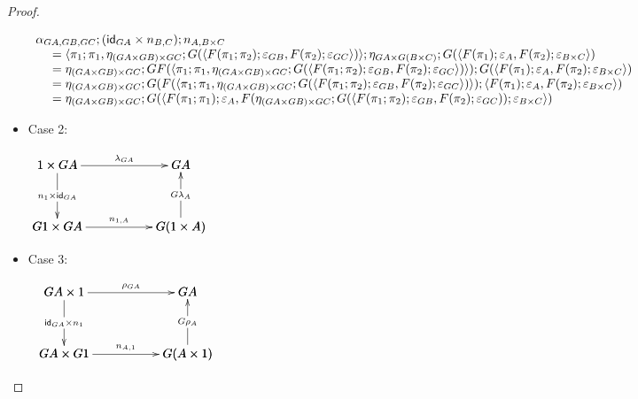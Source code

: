 \begin{proof}
\begin{itemize}
    \begin{center}
      \footnotesize
      \begin{math}
        \begin{array}{lll}
          \alpha_{GA,GB,GC};(\mathsf{id}_{GA} \times n_{B,C});n_{A,B \times C}\\
          \,\,\,\,\,\,\,\,=\langle \pi_1;\pi_1,  \eta_{(GA \times GB) \times GC};G(\langle F(\pi_1;\pi_2);\varepsilon_{GB}, F(\pi_2);\varepsilon_{GC} \rangle)\rangle;\eta_{GA \times G(B \times C)};G(\langle F(\pi_1);\varepsilon_A, F(\pi_2);\varepsilon_{B \times C} \rangle)\\
          \,\,\,\,\,\,\,\,=\eta_{(GA \times GB) \times GC};GF(\langle \pi_1;\pi_1,  \eta_{(GA \times GB) \times GC};G(\langle F(\pi_1;\pi_2);\varepsilon_{GB}, F(\pi_2);\varepsilon_{GC} \rangle)\rangle);G(\langle F(\pi_1);\varepsilon_A, F(\pi_2);\varepsilon_{B \times C} \rangle)\\
          \,\,\,\,\,\,\,\,=\eta_{(GA \times GB) \times GC};G(F(\langle \pi_1;\pi_1,  \eta_{(GA \times GB) \times GC};G(\langle F(\pi_1;\pi_2);\varepsilon_{GB}, F(\pi_2);\varepsilon_{GC} \rangle)\rangle);\langle F(\pi_1);\varepsilon_A, F(\pi_2);\varepsilon_{B \times C} \rangle)\\
          \,\,\,\,\,\,\,\,=\eta_{(GA \times GB) \times GC};G(\langle F(\pi_1;\pi_1);\varepsilon_A, F(\eta_{(GA \times GB) \times GC};G(\langle F(\pi_1;\pi_2);\varepsilon_{GB}, F(\pi_2);\varepsilon_{GC}));\varepsilon_{B \times C} \rangle)
          
        \end{array}
      \end{math}
    \end{center}

  \item[] Case 2:
    \begin{center}
      \begin{math}
        \bfig
        \square|amma|/->`->`<-`->/<1000,500>[
          1 \times GA`
          GA`
          G1 \times GA`
          G(1 \times A);
          {\lambda}_{GA}`
          n_{1} \times \id_{GA}`
          G{\lambda}_{A}`
          n_{1,A}]
        \efig
      \end{math}
    \end{center}

  \item[] Case 3:
    \begin{center}
      \begin{math}
        \begin{array}{lll}
          \bfig
          \square|amma|/->`->`<-`->/<1000,500>[
            GA \times 1`
            GA`
            GA \times G1`
            G(A \times 1);
            {\rho}_{GA}`
            \id_{GA} \times n_{1}`
            G{\rho}_{A}`
            n_{A,1}]
          \efig
        \end{array}
      \end{math}
    \end{center}


\end{itemize}
\end{proof}
